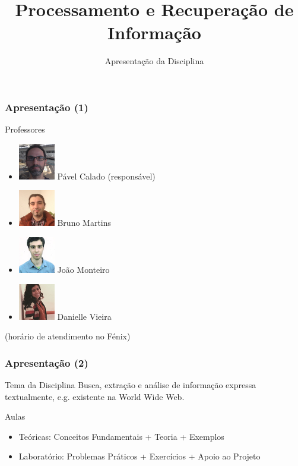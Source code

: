 \documentclass{beamer}
\title{Processamento e Recuperação de Informação}
\subtitle{Apresentação da Disciplina}
\begin{document}
\maketitle

\begin{frame} 
    \frametitle{Apresentação (1)}
    \begin{block}{Professores}
        \begin{itemize}
        \item[] \includegraphics[scale=0.5]{photo-ist14497} Pável Calado (responsável)
        \item[] \includegraphics[scale=0.5]{photo-ist24686} Bruno Martins
        \item[] \includegraphics[scale=0.5]{photo-ist170599} João Monteiro
        \item[] \includegraphics[scale=0.5]{photo-ist191486} Danielle Vieira
        \end{itemize}
    \end{block}
    \small\hfill (horário de atendimento no Fénix) 
\end{frame}

\begin{frame} 
    \frametitle{Apresentação (2)}
    \begin{block}{Tema da Disciplina}
        Busca, extração e análise de informação expressa textualmente, e.g. existente na World Wide Web.
    \end{block}
    \begin{block}{Aulas}
        \begin{itemize}
        \item Teóricas: Conceitos Fundamentais + Teoria + Exemplos
        \item Laboratório: Problemas Práticos + Exercícios + Apoio ao Projeto
        \end{itemize}
    \end{block}
\end{frame}
\end{document}
